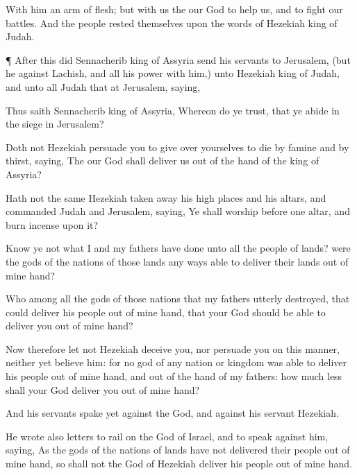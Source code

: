 {With him
{} an
arm of
flesh; but with us
{} the
{} our
God to
help us, and to
fight our
battles. And the
people
rested themselves upon the
words of
Hezekiah
king of
Judah.


\par }{\PP {}¶
After this did
Sennacherib
king of
Assyria
send his
servants to
Jerusalem, (but he
{} against
Lachish, and all his
power with him,) unto
Hezekiah
king of
Judah, and unto all
Judah that
{} at
Jerusalem,
saying,

Thus
saith
Sennacherib
king of
Assyria, Whereon do ye
trust, that ye
abide in the
siege in
Jerusalem?

Doth not
Hezekiah
persuade you to
give over yourselves to
die by
famine and by
thirst,
saying, The
{} our
God shall
deliver us out of the
hand of the
king of
Assyria?

Hath not the same
Hezekiah taken
away his high
places and his
altars, and
commanded
Judah and
Jerusalem,
saying, Ye shall
worship
before
one
altar, and burn
incense upon it?

Know ye not what I and my
fathers have
done unto all the
people of
{}
lands? were the
gods of the
nations of those
lands any
ways
able to
deliver their
lands out of mine
hand?

Who
{} among all the
gods of those
nations that my
fathers utterly
destroyed, that
could
deliver his
people out of mine
hand, that your
God should be
able to
deliver you out of mine
hand?

Now therefore let
not
Hezekiah
deceive you, nor
persuade you on this manner, neither yet
believe him: for no
god of any
nation or
kingdom was
able to
deliver his
people out of mine
hand, and out of the
hand of my
fathers: how much less shall your
God
deliver you out of mine
hand?

And his
servants
spake yet
{} against the
{}
God, and against his
servant
Hezekiah.

He
wrote also
letters to
rail on the
{}
God of
Israel, and to
speak against him,
saying, As the
gods of the
nations of
{}
lands have not
delivered their
people out of mine
hand, so shall not the
God of
Hezekiah
deliver his
people out of mine
hand.

}
